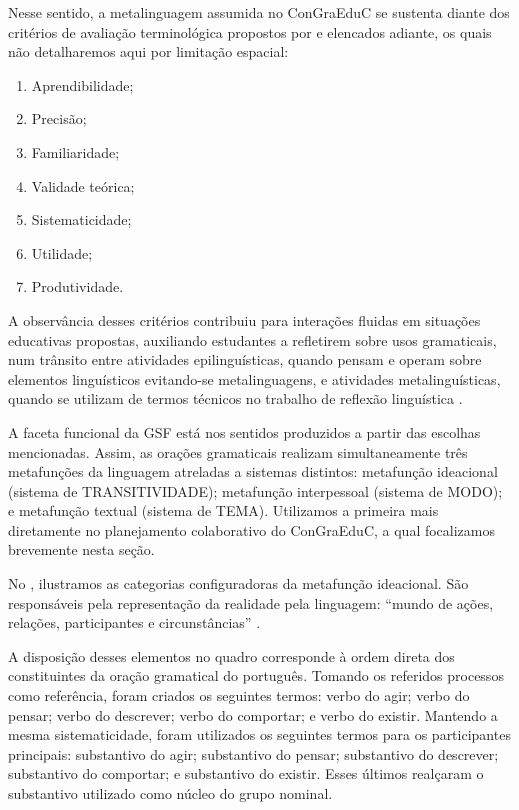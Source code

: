 Nesse sentido, a metalinguagem assumida no ConGraEduC se sustenta diante
dos critérios de avaliação terminológica propostos por \textcite{berry_terminology_2010} e
elencados adiante, os quais não detalharemos aqui por limitação
espacial: 

\begin{enumerate}[label=\alph*)]
	\item Aprendibilidade;
	\item Precisão;
	\item Familiaridade;
	\item Validade teórica;
	\item Sistematicidade;
	\item Utilidade;
	\item Produtividade.
\end{enumerate}

A observância desses critérios contribuiu para interações
fluidas em situações educativas propostas, auxiliando estudantes a
refletirem sobre usos gramaticais, num trânsito entre atividades
epilinguísticas, quando pensam e operam sobre elementos linguísticos
evitando-se metalinguagens, e atividades metalinguísticas, quando se
utilizam de termos técnicos no trabalho de reflexão linguística
\cite{franchi_criatividade_1987,silva_estudo_2011}.

A faceta funcional da GSF está nos sentidos produzidos a partir das
escolhas mencionadas. Assim, as orações gramaticais realizam
simultaneamente três metafunções da linguagem atreladas a sistemas
distintos: metafunção ideacional (sistema de TRANSITIVIDADE); metafunção
interpessoal (sistema de MODO); e metafunção textual (sistema de TEMA).
Utilizamos a primeira mais diretamente no planejamento colaborativo do
ConGraEduC, a qual focalizamos brevemente nesta seção.

No , ilustramos as categorias configuradoras da metafunção
ideacional. São responsáveis pela representação da realidade pela
linguagem: ``mundo de ações, relações, participantes e circunstâncias''
\cite[p. 206]{eggins_introduction_2004}.


A disposição desses elementos no quadro corresponde à ordem direta dos
constituintes da oração gramatical do português. Tomando os referidos
processos como referência, foram criados os seguintes termos: verbo do
agir; verbo do pensar; verbo do descrever; verbo do comportar; e verbo
do existir. Mantendo a mesma sistematicidade, foram utilizados os
seguintes termos para os participantes principais: substantivo do agir;
substantivo do pensar; substantivo do descrever; substantivo do
comportar; e substantivo do existir. Esses últimos realçaram o
substantivo utilizado como núcleo do grupo nominal.

